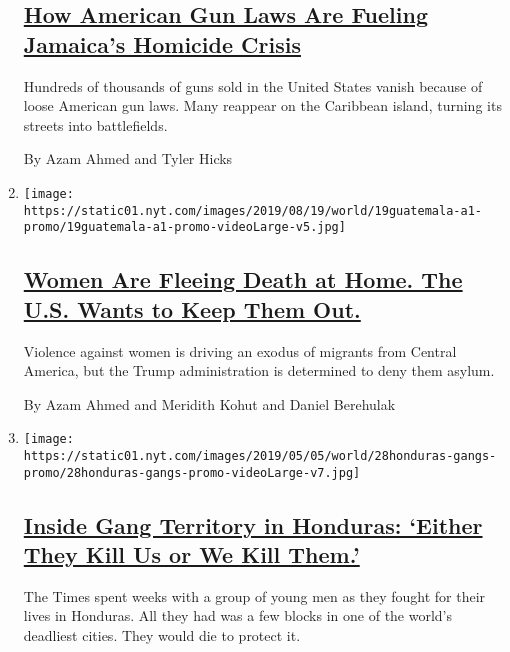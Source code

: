 \begin{enumerate}
  \hypertarget{how-american-gun-laws-are-fueling-jamaicas-homicide-crisis}{%
  \subsection{\texorpdfstring{\href{/2019/08/25/world/americas/one-handgun-9-murders-how-american-firearms-cause-carnage-abroad.html}{How
  American Gun Laws Are Fueling Jamaica's Homicide
  Crisis}}{How American Gun Laws Are Fueling Jamaica's Homicide Crisis}}\label{how-american-gun-laws-are-fueling-jamaicas-homicide-crisis}}

  Hundreds of thousands of guns sold in the United States vanish because
  of loose American gun laws. Many reappear on the Caribbean island,
  turning its streets into battlefields.

  By Azam Ahmed and Tyler Hicks
\item
  \texttt{[image: https://static01.nyt.com/images/2019/08/19/world/19guatemala-a1-promo/19guatemala-a1-promo-videoLarge-v5.jpg]}

  \hypertarget{women-are-fleeing-death-at-home-the-us-wants-to-keep-them-out}{%
  \subsection{\texorpdfstring{\href{/2019/08/18/world/americas/guatemala-violence-women-asylum.html}{Women
  Are Fleeing Death at Home. The U.S. Wants to Keep Them
  Out.}}{Women Are Fleeing Death at Home. The U.S. Wants to Keep Them Out.}}\label{women-are-fleeing-death-at-home-the-us-wants-to-keep-them-out}}

  Violence against women is driving an exodus of migrants from Central
  America, but the Trump administration is determined to deny them
  asylum.

  By Azam Ahmed and Meridith Kohut and Daniel Berehulak
\item
  \texttt{[image: https://static01.nyt.com/images/2019/05/05/world/28honduras-gangs-promo/28honduras-gangs-promo-videoLarge-v7.jpg]}

  \hypertarget{inside-gang-territory-in-honduras-either-they-kill-us-or-we-kill-them}{%
  \subsection{\texorpdfstring{\href{/interactive/2019/05/04/world/americas/honduras-gang-violence.html}{Inside
  Gang Territory in Honduras: `Either They Kill Us or We Kill
  Them.'}}{Inside Gang Territory in Honduras: `Either They Kill Us or We Kill Them.'}}\label{inside-gang-territory-in-honduras-either-they-kill-us-or-we-kill-them}}

  The Times spent weeks with a group of young men as they fought for
  their lives in Honduras. All they had was a few blocks in one of the
  world's deadliest cities. They would die to protect it.
\end{enumerate}

